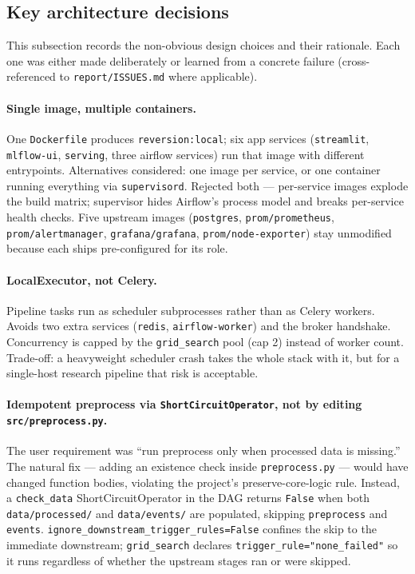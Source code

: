 \documentclass[11pt,a4paper]{article}
\begin{document}
\subsection{Key architecture decisions}\label{sec:archdec}

This subsection records the non-obvious design choices and their rationale. Each one was either made deliberately or learned from a concrete failure (cross-referenced to \texttt{report/ISSUES.md} where applicable).

\paragraph{Single image, multiple containers.}
One \texttt{Dockerfile} produces \texttt{reversion:local}; six app services (\texttt{streamlit}, \texttt{mlflow-ui}, \texttt{serving}, three airflow services) run that image with different entrypoints. Alternatives considered: one image per service, or one container running everything via \texttt{supervisord}. Rejected both --- per-service images explode the build matrix; supervisor hides Airflow's process model and breaks per-service health checks. Five upstream images (\texttt{postgres}, \texttt{prom/prometheus}, \texttt{prom/alertmanager}, \texttt{grafana/grafana}, \texttt{prom/node-exporter}) stay unmodified because each ships pre-configured for its role.

\paragraph{LocalExecutor, not Celery.}
Pipeline tasks run as scheduler subprocesses rather than as Celery workers. Avoids two extra services (\texttt{redis}, \texttt{airflow-worker}) and the broker handshake. Concurrency is capped by the \texttt{grid\_search} pool (cap 2) instead of worker count. Trade-off: a heavyweight scheduler crash takes the whole stack with it, but for a single-host research pipeline that risk is acceptable.

\paragraph{Idempotent preprocess via \texttt{ShortCircuitOperator}, not by editing \texttt{src/preprocess.py}.}
The user requirement was ``run preprocess only when processed data is missing.'' The natural fix --- adding an existence check inside \texttt{preprocess.py} --- would have changed function bodies, violating the project's preserve-core-logic rule. Instead, a \texttt{check\_data} ShortCircuitOperator in the DAG returns \texttt{False} when both \texttt{data/processed/} and \texttt{data/events/} are populated, skipping \texttt{preprocess} and \texttt{events}. \texttt{ignore\_downstream\_trigger\_rules=False} confines the skip to the immediate downstream; \texttt{grid\_search} declares \texttt{trigger\_rule="none\_failed"} so it runs regardless of whether the upstream stages ran or were skipped.
\end{document}
